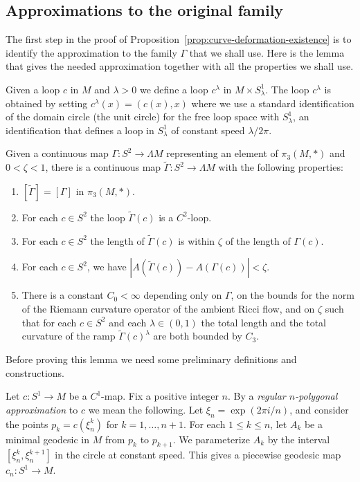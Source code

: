 \subsection{Approximations to the original family}

The first step in the proof of Proposition~\ref{prop:curve-deformation-existence} is to identify
the approximation to the family $\Gamma$ that we shall use. Here is
the lemma that gives the needed approximation together with all the
properties we shall use.

Given a loop $c$ in $M$ and $\lambda>0$ we define a loop $c^\lambda$
in $M\times S^1_\lambda$. The loop $c^\lambda$ is obtained by
setting $c^\lambda(x)=(c(x),x)$ where we use  a standard
identification of the domain circle (the unit circle) for the free
loop space with $S^1_\lambda$, an identification that defines a loop
in $S^1_\lambda$ of constant speed $\lambda/2\pi$.


\begin{lemma}
\label{lem:good-approximation-family}
\label{goodapprox}
Given a continuous map $\Gamma\colon S^2\to \Lambda M$ representing
an element of $\pi_3( M,*)$ and $0<\zeta<1$, there is a continuous
map $\widetilde \Gamma\colon S^2\to \Lambda M$ with the following
properties:
\begin{enumerate}
\item[(1)] $[\widetilde \Gamma]=[\Gamma]$ in $\pi_3(M,*)$.
\item[(2)] For each $c\in S^2$ the loop $\widetilde \Gamma(c)$ is a
$C^2$-loop.
\item[(3)] For each $c\in S^2$ the length of $\widetilde \Gamma(c)$ is
within $\zeta$ of the length of $\Gamma(c)$.
\item[(4)] For each $c\in S^2$, we have $|A(\widetilde
\Gamma(c))-A(\Gamma(c))|<\zeta$.
\item[(5)] There is a constant $C_0<\infty$ depending only on $\Gamma$,
on the bounds for the norm of the Riemann curvature operator of the
ambient Ricci flow, and on $\zeta$ such that for each $c\in S^2$ and
each $\lambda\in (0,1)$ the total length and the total curvature of
the ramp $\widetilde \Gamma(c)^\lambda$ are both bounded by $C_3$.
\end{enumerate}
\end{lemma}


Before proving this lemma we need some preliminary definitions and
constructions.

\begin{definition}
\label{def:n-polygonal-approximation}
Let $c\colon S^1\to M$ be a $C^1$-map.  Fix a positive integer $n$.
By a {\em regular $n$-polygonal approximation} to $c$ we mean the
following. Let $\xi_n=\exp(2\pi i/n)$, and consider the points
$p_k=c(\xi^k_n)$ for $k=1,\ldots,n+1$. For each $1\le k\le n$, let
$A_k$ be a minimal geodesic in $M$ from $p_k$ to $p_{k+1}$. We
parameterize $A_k$ by the interval $[\xi_n^k,\xi_n^{k+1}]$ in the
circle at constant speed. This gives a  piecewise geodesic map
$c_n\colon S^1\to M$.
\end{definition}

